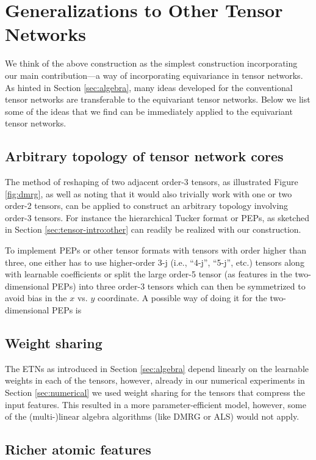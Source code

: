 \section{Generalizations to Other Tensor Networks}\label{sec:generalizations}

We think of the above construction as the simplest construction incorporating our main contribution---a way of incorporating equivariance in tensor networks.
As hinted in Section \ref{sec:algebra}, many ideas developed for the conventional tensor networks are transferable to the equivariant tensor networks.
Below we list some of the ideas that we find can be immediately applied to the equivariant tensor networks.

\subsection{Arbitrary topology of tensor network cores}

The method of reshaping of two adjacent order-3 tensors, as illustrated Figure \ref{fig:dmrg}, as well as noting that it would also trivially work with one or two order-2 tensors, can be applied to construct an arbitrary topology involving order-3 tensors. For instance the hierarchical Tucker format or PEPs, as sketched in Section \ref{sec:tensor-intro:other} can readily be realized with our construction.

To implement PEPs or other tensor formats with tensors with order higher than three, one either has to use higher-order 3-j (i.e., ``4-j'', ``5-j'', etc.) tensors along with learnable coefficients or split the large order-5 tensor (as features in the two-dimensional PEPs) into three order-3 tensors which can then be symmetrized to avoid bias in the $x$ vs. $y$ coordinate.
A possible way of doing it for the two-dimensional PEPs is

\subsection{Weight sharing}

The ETNs as introduced in Section \ref{sec:algebra} depend linearly on the learnable weights in each of the tensors, however, already in our numerical experiments in Section \ref{sec:numerical} we used weight sharing for the tensors that compress the input features.
This resulted in a more parameter-efficient model, however, some of the (multi-)linear algebra algorithms (like DMRG or ALS) would not apply.

\subsection{Richer atomic features}

